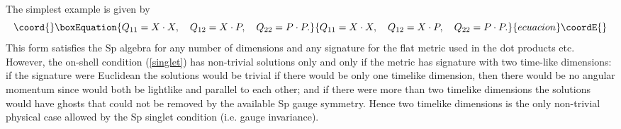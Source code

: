 \documentclass[a4paper,12pt]{article}
\begin{document}
The simplest example is given by \cite{conf}
\begin{equation}\coord{}\boxEquation{
Q_{11}=X\cdot X,\quad Q_{12}=X\cdot P,\quad Q_{22}=P\cdot P.
\label{simplest}
}{
Q_{11}=X\cdot X,\quad Q_{12}=X\cdot P,\quad Q_{22}=P\cdot P.
}{ecuacion}\coordE{}\end{equation}
This form satisfies the Sp\myHighlight{$\left( 2\right) $}\coordHE{} algebra for any number of
dimensions \coordHE{}  \coordHE{} and any signature for the flat
metric \coordHE{} used in the dot products \coordHE{} etc. However, the on-shell condition (\ref{singlet}) has non-trivial
solutions only and only if the metric \coordHE{} has signature \coordHE{} with two time-like dimensions: if the signature were Euclidean
the solutions would be trivial \coordHE{} if there would be only one
timelike dimension, then there would be no angular momentum \coordHE{} since
\coordHE{} would both be lightlike and parallel to each other; and if
there were more than two timelike dimensions the solutions would have ghosts
that could not be removed by the available Sp\myHighlight{$\left( 2\right) $}\coordHE{} gauge
symmetry. Hence two timelike dimensions is the only non-trivial physical
case allowed by the Sp\myHighlight{$\left( 2\right) $}\coordHE{} singlet condition (i.e. gauge
invariance).
\end{document}
